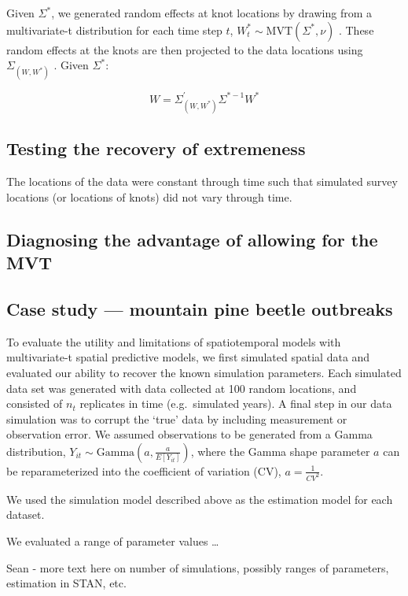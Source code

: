 \documentclass[12pt,english]{article}
\begin{document}
\begin{spacing}{1.05}
Given $\Sigma^*$, we generated random effects at knot
locations by drawing from a multivariate-t distribution for each time step $t$, 
$W_t^*\sim \mathrm{MVT}\left( \Sigma^{*},\nu \right)$ .
These random effects at the knots are then projected to the data locations using
$\Sigma_{\left( W,W^{*} \right)}$ \citep{latimer2009}.
Given ${\Sigma}^{*}$:

\begin{equation}
W=\Sigma_{\left(W,W^* \right)}^{'} \Sigma^{*-1}W^*
\end{equation}

\subsection{Testing the recovery of extremeness}

The locations of the data were constant
through time such that simulated survey locations (or locations of knots) did
not vary through time.


\subsection{Diagnosing the advantage of allowing for the MVT}

\subsection{Case study --- mountain pine beetle outbreaks}

To evaluate the utility and limitations of spatiotemporal models with
multivariate-t spatial predictive models, we first simulated spatial data and
evaluated our ability to recover the known simulation parameters. Each
simulated data set was generated with data collected at 
100 random locations, and consisted of
$n_t$ replicates in time (e.g.~simulated years). 
A final step in our data simulation was to corrupt the `true' data by
including measurement or observation error. We assumed observations to be
generated from a Gamma distribution, 
$Y_{it}\sim \mathrm{Gamma}\left(a,\frac {a}{E[Y_{it}]} \right)$, 
where the Gamma shape parameter
$a$ can be reparameterized into the coefficient of variation (CV), 
$a=\frac{1}{CV^2}$.

We used the simulation model described above as the estimation model for each
dataset.

We evaluated a range of parameter values \ldots

Sean - more text here on number of simulations, possibly ranges of
parameters, estimation in STAN, etc.


\end{spacing}
\end{document}
